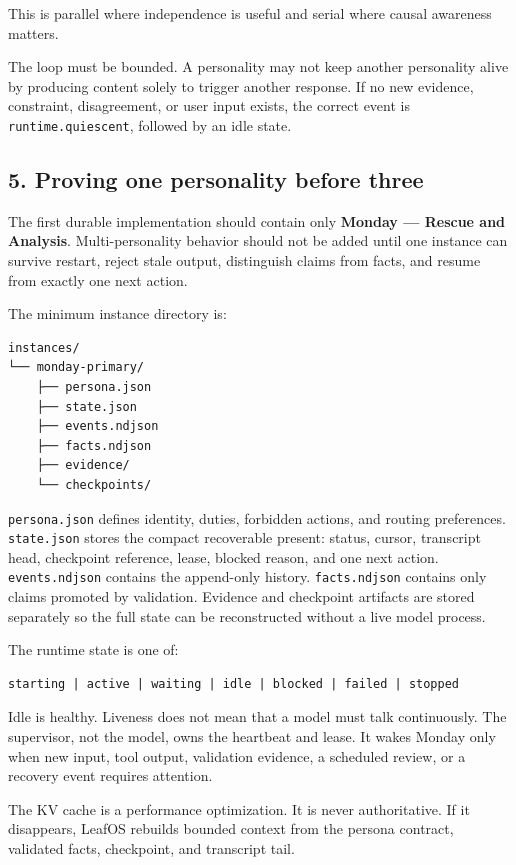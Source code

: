 This is parallel where independence is useful and serial where causal awareness
matters.

The loop must be bounded. A personality may not keep another personality alive
by producing content solely to trigger another response. If no new evidence,
constraint, disagreement, or user input exists, the correct event is
\texttt{runtime.quiescent}, followed by an idle state.

\subsection{5. Proving one personality before three}

The first durable implementation should contain only \textbf{Monday --- Rescue and
Analysis}. Multi-personality behavior should not be added until one instance
can survive restart, reject stale output, distinguish claims from facts, and
resume from exactly one next action.

The minimum instance directory is:

\begin{verbatim}
instances/
└── monday-primary/
    ├── persona.json
    ├── state.json
    ├── events.ndjson
    ├── facts.ndjson
    ├── evidence/
    └── checkpoints/
\end{verbatim}

\texttt{persona.json} defines identity, duties, forbidden actions, and routing
preferences. \texttt{state.json} stores the compact recoverable present: status,
cursor, transcript head, checkpoint reference, lease, blocked reason, and one
next action. \texttt{events.ndjson} contains the append-only history. \texttt{facts.ndjson}
contains only claims promoted by validation. Evidence and checkpoint artifacts
are stored separately so the full state can be reconstructed without a live
model process.

The runtime state is one of:

\begin{verbatim}
starting | active | waiting | idle | blocked | failed | stopped
\end{verbatim}

Idle is healthy. Liveness does not mean that a model must talk continuously.
The supervisor, not the model, owns the heartbeat and lease. It wakes Monday
only when new input, tool output, validation evidence, a scheduled review, or a
recovery event requires attention.

The KV cache is a performance optimization. It is never authoritative. If it
disappears, LeafOS rebuilds bounded context from the persona contract, validated
facts, checkpoint, and transcript tail.

